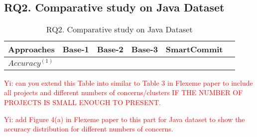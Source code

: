 \subsection{RQ2. Comparative study on Java Dataset}

\begin{table}[t]
	\caption{RQ2. Comparative study on Java Dataset}
	\vspace{-0.1in}
	\begin{center}
		\footnotesize
		\tabcolsep 4pt
		\renewcommand{\arraystretch}{1} \begin{tabular}{p{1.4cm}<{\centering}|p{0.7cm}<{\centering}p{0.7cm}<{\centering}p{0.7cm}<{\centering}p{1.5cm}<{\centering}|p{0.7cm}<{\centering}}
			
			\hline
			Approaches          & Base-1 & Base-2 & Base-3 & SmartCommit & \tool\\
			\hline
			$Accuracy^{(1)}$   &                &			 	&				   &		&      \\
			\hline
		\end{tabular}
		\label{RQ2-result}
	\end{center}
\end{table}

\textcolor{red}{Yi: can you extend this Table into similar to Table 3 in Flexeme paper to include all projects and different numbers of concerns/clusters IF THE NUMBER OF PROJECTS IS SMALL ENOUGH TO PRESENT.}

\textcolor{red}{Yi: add Figure 4(a) in Flexeme paper to this part for
  Java dataset to show the accuracy distribution for different numbers
  of concerns.}
